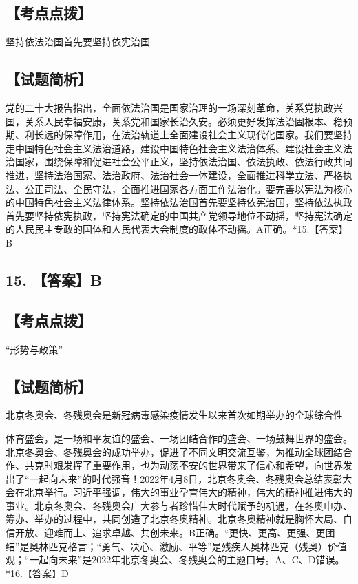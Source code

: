 \documentclass[UTF8,11pt]{ctexart}
\begin{document}
\subsection*{【考点点拨】}

坚持依法治国首先要坚持依宪治国


\subsection*{【试题简析】}

党的二十大报告指出，全面依法治国是国家治理的一场深刻革命，关系党执政兴国，关系人民幸福安康，关系党和国家长治久安。必须更好发挥法治固根本、稳预期、利长远的保障作用，在法治轨道上全面建设社会主义现代化国家。我们要坚持走中国特色社会主义法治道路，建设中国特色社会主义法治体系、建设社会主义法治国家，围绕保障和促进社会公平正义，坚持依法治国、依法执政、依法行政共同推进，坚持法治国家、法治政府、法治社会一体建设，全面推进科学立法、严格执法、公正司法、全民守法，全面推进国家各方面工作法治化。要完善以宪法为核心的中国特色社会主义法律体系。坚持依法治国首先要坚持依宪治国，坚持依法执政首先要坚持依宪执政，坚持宪法确定的中国共产党领导地位不动摇，坚持宪法确定的人民民主专政的国体和人民代表大会制度的政体不动摇。A正确。*15.【答案】B


\subsection*{15. 【答案】B}

\subsection*{【考点点拨】}

“形势与政策”


\subsection*{【试题简析】}

北京冬奥会、冬残奥会是新冠病毒感染疫情发生以来首次如期举办的全球综合性


体育盛会，是一场和平友谊的盛会、一场团结合作的盛会、一场鼓舞世界的盛会。北京冬奥会、冬残奥会的成功举办，促进了不同文明交流互鉴，为推动全球团结合作、共克时艰发挥了重要作用，也为动荡不安的世界带来了信心和希望，向世界发出了“一起向未来”的时代强音！2022年4月8日，北京冬奥会、冬残奥会总结表彰大会在北京举行。习近平强调，伟大的事业孕育伟大的精神，伟大的精神推进伟大的事业。北京冬奥会、冬残奥会广大参与者珍惜伟大时代赋予的机遇，在冬奥申办、筹办、举办的过程中，共同创造了北京冬奥精神。北京冬奥精神就是胸怀大局、自信开放、迎难而上、追求卓越、共创未来。B正确。“更快、更高、更强、更团结”是奥林匹克格言；“勇气、决心、激励、平等”是残疾人奥林匹克（残奥）价值观；“一起向未来”是2022年北京冬奥会、冬残奥会的主题口号。A、C、D错误。*16.【答案】D
\end{document}
